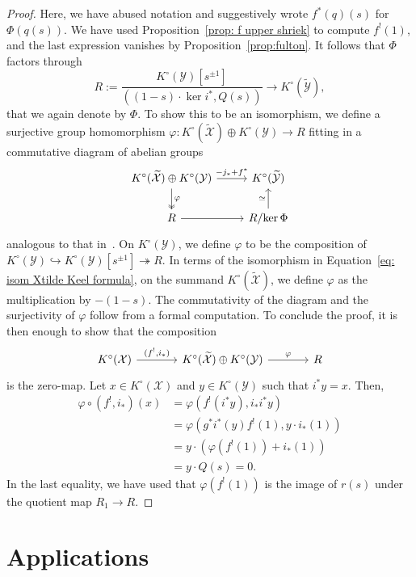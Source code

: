 \documentclass[12pt]{amsart}
\newcommand{\cX}{\mathcal{X}}
\newcommand{\cY}{\mathcal{Y}}
\newcommand{\tcY}{\widetilde{\mathcal{Y}}}
\newcommand{\tcX}{\widetilde{\mathcal{X}}}
\newcommand{\Kring}{K^{\circ}}
\theoremstyle{definition}
\begin{document}
\begin{proof}
    Here, we have abused notation and suggestively wrote $f^*(q)(s)$ for $\Phi(q(s))$.
    We have used Proposition~\ref{prop: f upper shriek} to compute $f^!(1)$, and the last expression vanishes by Proposition~\ref{prop:fulton}. It follows that $\Phi$ factors through
    \[
        R:=\frac{\Kring(\cY)[s^{\pm1}]}{((1-s)\cdot\ker i^*,Q(s))}\longrightarrow\Kring(\tcY),
    \]
    that we again denote by $\Phi$. To show this to be an isomorphism, we define a surjective group homomorphism $\varphi:\Kring(\tcX)\oplus\Kring(\cY)\rightarrow R$ fitting in a commutative diagram of abelian groups
    \[
    \begin{tikzcd}
        \Kring(\tcX)\oplus\Kring(\cY)\arrow[d,twoheadrightarrow,"\varphi"]\arrow[r,"-j_*+f^*"] & \Kring(\tcY)\\
        R\arrow[r] & R/\!\ker\Phi\arrow[u,"\simeq"]
    \end{tikzcd}
    \]
    analogous to that in~\cite[page 573]{Keel}.
    On $\Kring(\cY)$, we define $\varphi$ to be the composition of $\Kring(\cY)\hookrightarrow\Kring(\cY)[s^{\pm1}]\twoheadrightarrow R$. In terms of the isomorphism in Equation~\eqref{eq: isom Xtilde Keel formula}, on the summand $\Kring(\tcX)$, we define $\varphi$ as the multiplication by $-(1-s)$.
    The commutativity of the diagram and the surjectivity of $\varphi$ follow from a formal computation. To conclude the proof, it is then enough to show that the composition
    \[
    \begin{tikzcd}[column sep=large]
        \Kring(\cX)\arrow[r,"{(f^{!},i_*)}"] & \Kring(\tcX)\oplus\Kring(\cY)\arrow[r,"\varphi"] & R
    \end{tikzcd}
    \]
    is the zero-map. Let $x\in\Kring(\cX)$ and $y\in\Kring(\cY)$ such that $i^*y=x$. Then,
    \begin{align*}
        \varphi\circ(f^!,i_*)(x)&=\varphi(f^!(i^*y),i_*i^*y)\\
        &=\varphi(g^*i^*(y)f^!(1),y\cdot i_*(1))\\
        &=y\cdot(\varphi(f^!(1))+i_*(1))\\
        &=y\cdot Q(s)=0.
    \end{align*}
    In the last equality, we have used that $\varphi(f^!(1))$ is the image of $r(s)$ under the quotient map $R_1\rightarrow R$.
\end{proof}

\section{Applications}\label{sec:applications}
\end{document}
